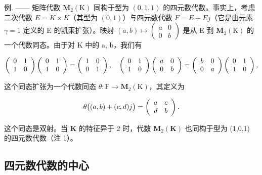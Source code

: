 例. —— 矩阵代数 \(\mathbf{M}_{2}(\mathrm{K})\) 同构于型为 \((0,1,1)\) 的四元数代数。事实上，考虑二次代数 \(E = K \times K\)（其型为 \((0,1)\)）与四元数代数 \(F = E + Ej\)（它是由元素 \(\gamma = 1\) 定义的 E 的凯莱扩张）。映射 \((a,b) \mapsto \begin{pmatrix} a & 0 \\ 0 & b \end{pmatrix}\) 是从 E 到 \(\mathbf{M}_{2}(\mathrm{K})\) 的一个代数同态。由于对 K 中的 a, b，我们有

\[
\left( \begin{array}{c c} 0 & 1 \\ 1 & 0 \end{array} \right) \left( \begin{array}{c c} 0 & 1 \\ 1 & 0 \end{array} \right) = \left( \begin{array}{c c} 1 & 0 \\ 0 & 1 \end{array} \right), \quad \left( \begin{array}{c c} 0 & 1 \\ 1 & 0 \end{array} \right) \left( \begin{array}{c c} a & 0 \\ 0 & b \end{array} \right) = \left( \begin{array}{c c} b & 0 \\ 0 & a \end{array} \right) \left( \begin{array}{c c} 0 & 1 \\ 1 & 0 \end{array} \right),
\]

这个同态扩张为一个代数同态 \(\theta : \mathrm{F} \longrightarrow \mathbf{M}_2(\mathrm{K})\)，其定义为

\[
\theta \bigl ((a, b) + (c, d) j \bigr) = \left( \begin{array}{c c} a & c \\ d & b \end{array} \right)  .
\]

这个同态是双射。当 \(\mathbf{K}\) 的特征异于 2 时，代数 \(\mathbf{M}_2(\mathbf{K})\) 也同构于型为 (1,0,1) 的四元数代数（注 1）。

\subsection{四元数代数的中心}

